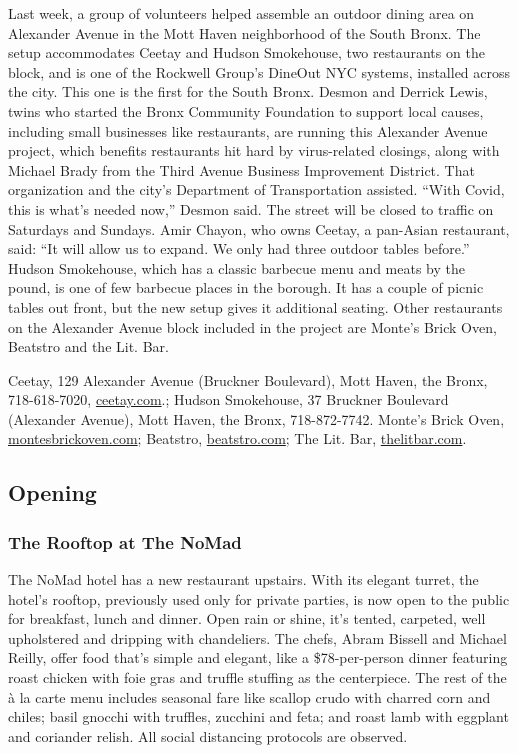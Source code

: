 Last week, a group of volunteers helped assemble an outdoor dining area
on Alexander Avenue in the Mott Haven neighborhood of the South Bronx.
The setup accommodates Ceetay and Hudson Smokehouse, two restaurants on
the block, and is one of the Rockwell Group's DineOut NYC systems,
installed across the city. This one is the first for the South Bronx.
Desmon and Derrick Lewis, twins who started the Bronx Community
Foundation to support local causes, including small businesses like
restaurants, are running this Alexander Avenue project, which benefits
restaurants hit hard by virus-related closings, along with Michael Brady
from the Third Avenue Business Improvement District. That organization
and the city's Department of Transportation assisted. ``With Covid, this
is what's needed now,'' Desmon said. The street will be closed to
traffic on Saturdays and Sundays. Amir Chayon, who owns Ceetay, a
pan-Asian restaurant, said: ``It will allow us to expand. We only had
three outdoor tables before.'' Hudson Smokehouse, which has a classic
barbecue menu and meats by the pound, is one of few barbecue places in
the borough. It has a couple of picnic tables out front, but the new
setup gives it additional seating. Other restaurants on the Alexander
Avenue block included in the project are Monte's Brick Oven, Beatstro
and the Lit. Bar.

Ceetay, 129 Alexander Avenue (Bruckner Boulevard), Mott Haven, the
Bronx, 718-618-7020, \href{http://ceetay.com/}{ceetay.com}.; Hudson
Smokehouse, 37 Bruckner Boulevard (Alexander Avenue), Mott Haven, the
Bronx, 718-872-7742. Monte's Brick Oven,
\href{https://www.montesbrickoven.com/}{montesbrickoven.com}; Beatstro,
\href{https://www.beatstro.com/}{beatstro.com}; The Lit. Bar,
\href{http://www.thelitbar.com/}{thelitbar.com}.

\hypertarget{opening}{%
\subsection{Opening}\label{opening}}

\hypertarget{the-rooftop-at-the-nomad-}{%
\subsubsection{The Rooftop at The NoMad
}\label{the-rooftop-at-the-nomad-}}

The NoMad hotel has a new restaurant upstairs. With its elegant turret,
the hotel's rooftop, previously used only for private parties, is now
open to the public for breakfast, lunch and dinner. Open rain or shine,
it's tented, carpeted, well upholstered and dripping with chandeliers.
The chefs, Abram Bissell and Michael Reilly, offer food that's simple
and elegant, like a \$78-per-person dinner featuring roast chicken with
foie gras and truffle stuffing as the centerpiece. The rest of the à la
carte menu includes seasonal fare like scallop crudo with charred corn
and chiles; basil gnocchi with truffles, zucchini and feta; and roast
lamb with eggplant and coriander relish. All social distancing protocols
are observed.

